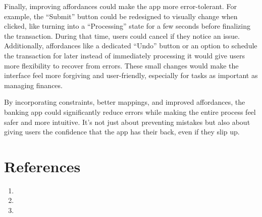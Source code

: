 \documentclass[
	letterpaper, %
]{jdf}
\begin{document}
Finally, improving affordances could make the app more error-tolerant. For example, the “Submit” button could be redesigned to visually change when clicked, like turning into a “Processing” state for a few seconds before finalizing the transaction. During that time, users could cancel if they notice an issue. Additionally, affordances like a dedicated “Undo” button or an option to schedule the transaction for later instead of immediately processing it would give users more flexibility to recover from errors. These small changes would make the interface feel more forgiving and user-friendly, especially for tasks as important as managing finances.

By incorporating constraints, better mappings, and improved affordances, the banking app could significantly reduce errors while making the entire process feel safer and more intuitive. It’s not just about preventing mistakes but also about giving users the confidence that the app has their back, even if they slip up.

\newpage

\section{References}

\printbibliography[heading=none]
\begin{enumerate}
    \item 
    \item 
    \item 

\end{enumerate}
\end{document}
